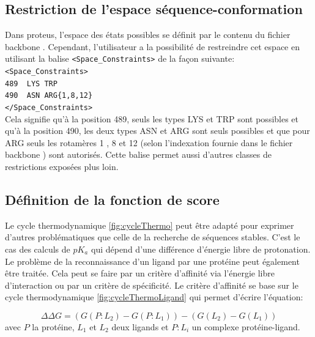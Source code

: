 \subsection{Restriction de l'espace séquence-conformation}
\label{sub:restric}
Dans proteus, l'espace des états possibles se définit par le contenu du fichier \og backbone \fg. Cependant, l'utilisateur a la possibilité de restreindre cet espace en utilisant la balise \verb!<Space_Constraints>! de la façon suivante:\\
\verb!<Space_Constraints>! \\
\verb!489  LYS TRP! \\
\verb!490  ASN ARG{1,8,12}! \\
\verb!</Space_Constraints>! \\
Cela signifie qu'à la position 489, seuls les types LYS et TRP sont possibles et qu'à la position 490, les deux types ASN et ARG sont seuls possibles et que pour ARG seuls les rotamères 1 , 8  et 12 (selon l'indexation fournie dans le fichier \og backbone \fg) sont autorisés. Cette balise permet aussi d'autres classes de restrictions exposées plus loin.

\subsection{Définition de la fonction de score }

 Le cycle thermodynamique \ref{fig:cycleThermo} peut être adapté pour exprimer d'autres problématiques que celle de la recherche de séquences stables. C'est le cas des calculs de $pK_a$ qui dépend d'une différence d'énergie libre de protonation. Le  problème de la reconnaissance d'un ligand par une protéine peut également être traitée. Cela peut se faire par un critère d'affinité via l'énergie libre d'interaction ou par un critère de spécificité. Le critère d'affinité se base sur le cycle thermodynamique  \ref{fig:cycleThermoLigand} qui permet d'écrire l'équation:

 \begin{equation}
   \label{deltaG2}
\Delta \Delta G = (G(P:L_2)- G(P:L_1)) - (G(L_2) - G(L_1))
\end{equation}  
avec $P$ la protéine, $L_1$ et $L_2$ deux ligands et $P:L_i$ un complexe protéine-ligand. 

